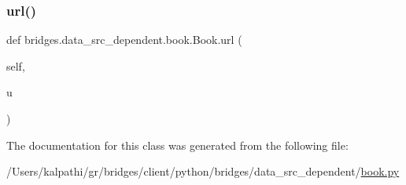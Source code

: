 \mbox{\label{classbridges_1_1data__src__dependent_1_1book_1_1_book_a193b108cb73c94087a907e61481618e2}} 
\subsubsection{\texorpdfstring{url()}{url()}\hspace{0.1cm}{\footnotesize\ttfamily [2/2]}}
{\footnotesize\ttfamily def bridges.\+data\+\_\+src\+\_\+dependent.\+book.\+Book.\+url (\begin{DoxyParamCaption}\item[{}]{self,  }\item[{}]{u }\end{DoxyParamCaption})}



The documentation for this class was generated from the following file\+:\begin{DoxyCompactItemize}
\item 
/\+Users/kalpathi/gr/bridges/client/python/bridges/data\+\_\+src\+\_\+dependent/\mbox{\hyperlink{book_8py}{book.\+py}}\end{DoxyCompactItemize}

